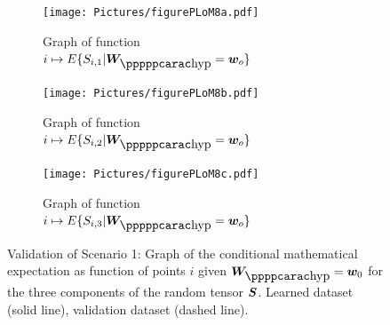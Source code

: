 \begin{figure}[!htb]
    \centering
    \begin{subfigure}[b]{0.33\textwidth}
    \centering
        \texttt{[image: Pictures/figurePLoM8a.pdf]}
        \caption{Graph of function $i\mapsto E\{ S_{i,1} \vert \bfW_\hyppp = \bfw_o \}$}
        \label{fig:figurePLoM8a}
    \end{subfigure}
    \centering
    \begin{subfigure}[b]{0.33\textwidth}
    \centering
        \texttt{[image: Pictures/figurePLoM8b.pdf]}
        \caption{Graph of function $i\mapsto E\{ S_{i,2} \vert \bfW_\hyppp = \bfw_o \}$}
        \label{fig:figurePLoM8b}
    \end{subfigure}
    \centering
    \begin{subfigure}[b]{0.33\textwidth}
    \centering
        \texttt{[image: Pictures/figurePLoM8c.pdf]}
        \caption{Graph of function $i\mapsto E\{ S_{i,3} \vert \bfW_\hyppp = \bfw_o \}$}
        \label{fig:figurePLoM8c}
    \end{subfigure}
    \caption{Validation of Scenario 1: Graph of the conditional mathematical expectation as function of points $i$ given $\bfW_\hypp =\bfw_0$ for the three components of the random tensor ${\boldsymbol{S}}$.  Learned dataset (solid line), validation dataset (dashed line).}
    \label{fig:figurePLoM8}
\end{figure}
%

